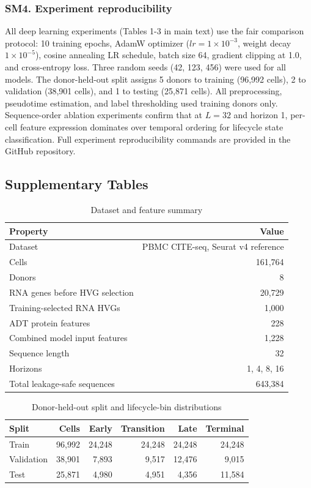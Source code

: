 \documentclass[11pt]{article}
\begin{document}
\subsubsection*{SM4. Experiment reproducibility}
All deep learning experiments (Tables 1-3 in main text) use the fair comparison protocol: 10 training epochs, AdamW optimizer ($lr=1\times10^{-3}$, weight decay $1\times10^{-5}$), cosine annealing LR schedule, batch size 64, gradient clipping at 1.0, and cross-entropy loss. Three random seeds (42, 123, 456) were used for all models. The donor-held-out split assigns 5 donors to training (96,992 cells), 2 to validation (38,901 cells), and 1 to testing (25,871 cells). All preprocessing, pseudotime estimation, and label thresholding used training donors only. Sequence-order ablation experiments confirm that at $L=32$ and horizon 1, per-cell feature expression dominates over temporal ordering for lifecycle state classification. Full experiment reproducibility commands are provided in the GitHub repository.

\subsection*{Supplementary Tables}

\begin{table}[H]
\centering
\caption{Dataset and feature summary}
\label{tab:S1_dataset}
\small
\begin{tabular}{lr}
\toprule
\textbf{Property} & \textbf{Value} \\
\midrule
Dataset & PBMC CITE-seq, Seurat v4 reference \\
Cells & 161,764 \\
Donors & 8 \\
RNA genes before HVG selection & 20,729 \\
Training-selected RNA HVGs & 1,000 \\
ADT protein features & 228 \\
Combined model input features & 1,228 \\
Sequence length & 32 \\
Horizons & 1, 4, 8, 16 \\
Total leakage-safe sequences & 643,384 \\
\bottomrule
\end{tabular}
\end{table}

\begin{table}[H]
\centering
\caption{Donor-held-out split and lifecycle-bin distributions}
\label{tab:S2_split_labels}
\small
\begin{tabular}{lrrrrr}
\toprule
\textbf{Split} & \textbf{Cells} & \textbf{Early} & \textbf{Transition} & \textbf{Late} & \textbf{Terminal} \\
\midrule
Train & 96,992 & 24,248 & 24,248 & 24,248 & 24,248 \\
Validation & 38,901 & 7,893 & 9,517 & 12,476 & 9,015 \\
Test & 25,871 & 4,980 & 4,951 & 4,356 & 11,584 \\
\bottomrule
\end{tabular}
\end{table}
\end{document}
